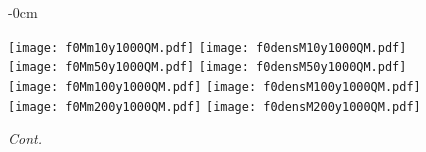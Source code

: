 \documentclass[universe,article,accept,moreauthors,pdftex]{Definitions/mdpi}
\begin{document}
\begin{figure}[H]\ContinuedFloat


\begin{adjustwidth}{-\extralength}{0cm}
\centering %

{\texttt{[image: f0Mm10y1000QM.pdf]}\vspace{3pt}
	  \texttt{[image: f0densM10y1000QM.pdf]}}\\\vspace{5pt}
{\texttt{[image: f0Mm50y1000QM.pdf]}\vspace{3pt}
	  \texttt{[image: f0densM50y1000QM.pdf]}}\\\vspace{5pt}
{\texttt{[image: f0Mm100y1000QM.pdf]}\vspace{3pt}
	  \texttt{[image: f0densM100y1000QM.pdf]}}\\\vspace{5pt}
{\texttt{[image: f0Mm200y1000QM.pdf]}\vspace{3pt}
	  \texttt{[image: f0densM200y1000QM.pdf]}}\\
\end{adjustwidth}
\caption{\emph{Cont.} }
\label{fig:f0Mdens1000QM}

\end{figure}
\end{document}

